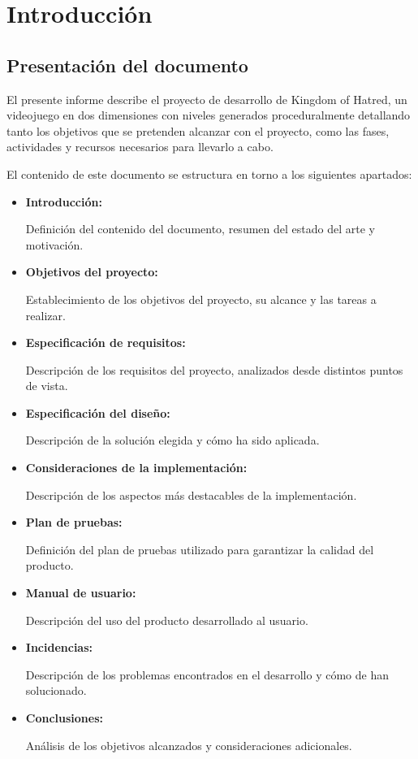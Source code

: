 \chapter{Introducción}\label{cha:introduccion}

	\section{Presentación del documento}

		El presente informe describe el proyecto de desarrollo de Kingdom of Hatred, un videojuego en dos dimensiones con niveles generados proceduralmente detallando tanto los objetivos que se pretenden alcanzar con el proyecto, como las fases, actividades y recursos necesarios para llevarlo a cabo.

		El contenido de este documento se estructura en torno a los siguientes apartados:

		\begin{itemize}
			\item \textbf{Introducción:}
				
			Definición del contenido del documento, resumen del estado del arte y motivación.
			
			\item \textbf{Objetivos del proyecto:}
				
			Establecimiento de los objetivos del proyecto, su alcance y las tareas a realizar.
			
			\item \textbf{Especificación de requisitos:}

			Descripción de los requisitos del proyecto, analizados desde distintos puntos de vista.

			\item \textbf{Especificación del diseño:}
			
			Descripción de la solución elegida y cómo ha sido aplicada.

			\item \textbf{Consideraciones de la implementación:}

			Descripción de los aspectos más destacables de la implementación.

			\item \textbf{Plan de pruebas:}

			Definición del plan de pruebas utilizado para garantizar la calidad del producto.

			\item \textbf{Manual de usuario:}

			Descripción del uso del producto desarrollado al usuario.

			\item \textbf{Incidencias:}

			Descripción de los problemas encontrados en el desarrollo y cómo de han solucionado.

			\item \textbf{Conclusiones:}

			Análisis de los objetivos alcanzados y consideraciones adicionales.
		\end{itemize}

